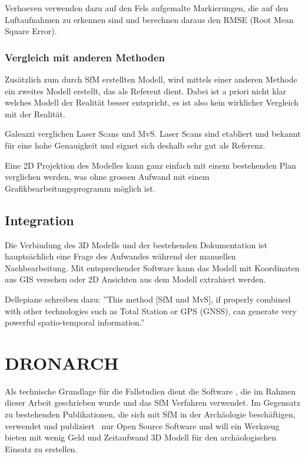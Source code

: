 				Verhoeven \etal{} verwenden dazu auf den Fels aufgemalte Markierungen, die auf den Luftaufnahmen zu erkennen sind und berechnen daraus den RMSE (Root Mean Square Error).

			\subsubsection{Vergleich mit anderen Methoden}
				Zusätzlich zum durch SfM erstellten Modell, wird mittels einer anderen Methode ein zweites Modell erstellt, das als Referent dient. Dabei ist a priori nicht klar welches Modell der Realität besser entspricht, es ist also kein wirklicher Vergleich mit der Realität.
				
				Galeazzi \etal{} verglichen Laser Scans und MvS. Laser Scans sind etabliert und bekannt für eine hohe Genauigkeit und eignet sich deshalb sehr gut als Referenz.
				
				Eine 2D Projektion des Modelles kann ganz einfach mit einem bestehenden Plan verglichen werden, was ohne grossen Aufwand mit einem Grafikbearbeitungsprogramm möglich ist.
			
		\subsection{Integration}
			Die Verbindung des 3D Modells und der bestehenden Dokumentation ist hauptsächlich eine Frage des Aufwandes während der manuellen Nachbearbeitung. Mit entsprechender Software kann das Modell mit Koordinaten aus GIS versehen oder 2D Ansichten aus dem Modell extrahiert werden.
			
			Dellepiane \etal schreiben dazu: ''This method [SfM und MvS], if properly combined with other technologies such as Total Station or GPS (GNSS), can generate very powerful spatio-temporal information.''
		
	\section{DRONARCH}
		Als technische Grundlage für die Fallstudien dient die Software \dronarch{}, die im Rahmen dieser Arbeit geschrieben wurde und das SfM Verfahren verwendet.
		Im Gegensatz zu bestehenden Publikationen, die sich mit SfM in der Archäologie beschäftigen, verwendet und publiziert \dronarch\ nur Open Source Software und will ein Werkzeug bieten mit wenig Geld und Zeitaufwand 3D Modell für den archäologischen Einsatz zu erstellen.

	